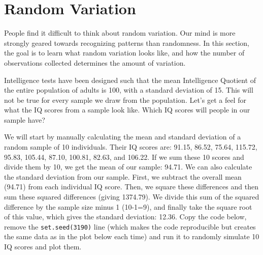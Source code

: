 \documentclass[
  oneside]{krantz}
\begin{document}
\hypertarget{random-variation}{%
\section{Random Variation}\label{random-variation}}

People find it difficult to think about random variation. Our mind is more strongly geared towards recognizing patterns than randomness. In this section, the goal is to learn what random variation looks like, and how the number of observations collected determines the amount of variation.

Intelligence tests have been designed such that the mean Intelligence Quotient of the entire population of adults is 100, with a standard deviation of 15. This will not be true for every sample we draw from the population. Let's get a feel for what the IQ scores from a sample look like. Which IQ scores will people in our sample have?

We will start by manually calculating the mean and standard deviation of a random sample of 10 individuals. Their IQ scores are: 91.15, 86.52, 75.64, 115.72, 95.83, 105.44, 87.10, 100.81, 82.63, and 106.22. If we sum these 10 scores and divide them by 10, we get the mean of our sample: 94.71. We can also calculate the standard deviation from our sample. First, we subtract the overall mean (94.71) from each individual IQ score. Then, we square these differences and then sum these squared differences (giving 1374.79). We divide this sum of the squared difference by the sample size minus 1 (10-1=9), and finally take the square root of this value, which gives the standard deviation: 12.36. Copy the code below, remove the \texttt{set.seed(3190)} line (which makes the code reproducible but creates the same data as in the plot below each time) and run it to randomly simulate 10 IQ scores and plot them.
\end{document}
